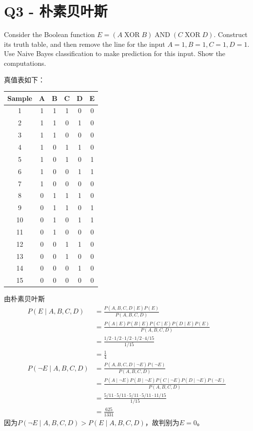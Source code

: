 \documentclass[a4paper, 11pt]{article}
\begin{document}
\newpage
\section{Q3 - 朴素贝叶斯}
\begin{question}\normalfont
Consider the Boolean function $E = (A\;\mathrm{XOR}\;B) \;\mathrm{AND}\; (C\;\mathrm{XOR}\;D)$. Construct its truth table, and then remove the line for the input $A = 1, B = 1, C = 1, D = 1$. Use Naive Bayes classification to make prediction for this input. Show the computations.
\end{question}
\begin{answer}
真值表如下：
\begin{center}
\begin{longtable}{|c|c|c|c|c|c|}\hline
Sample & A & B & C & D & E\\\hline
1 & 1 & 1 & 1 & 0 & 0\\\hline
2 & 1 & 1 & 0 & 1 & 0\\\hline
3 & 1 & 1 & 0 & 0 & 0\\\hline
4 & 1 & 0 & 1 & 1 & 0\\\hline
5 & 1 & 0 & 1 & 0 & 1\\\hline
6 & 1 & 0 & 0 & 1 & 1\\\hline
7 & 1 & 0 & 0 & 0 & 0\\\hline
8 & 0 & 1 & 1 & 1 & 0\\\hline
9 & 0 & 1 & 1 & 0 & 1\\\hline
10 & 0 & 1 & 0 & 1 & 1\\\hline
11 & 0 & 1 & 0 & 0 & 0\\\hline
12 & 0 & 0 & 1 & 1 & 0\\\hline
13 & 0 & 0 & 1 & 0 & 0\\\hline
14 & 0 & 0 & 0 & 1 & 0\\\hline
15 & 0 & 0 & 0 & 0 & 0\\\hline
\end{longtable}
\end{center}
由朴素贝叶斯
\[\begin{aligned}
P(E\mid A,B,C,D)
&=\frac{P(A,B,C,D\mid E)P(E)}{P(A,B,C,D)}\\
&=\frac{P(A\mid E) P(B\mid E) P(C\mid E) P(D\mid E) P(E)}{P(A,B,C,D)}\\
&=\frac{1/2\cdot 1/2\cdot 1/2\cdot 1/2\cdot 4/15}{1/15}\\
&=\frac{1}{4}\\
P(\lnot E\mid A,B,C,D)
&=\frac{P(A,B,C,D\mid \lnot E)P(\lnot E)}{P(A,B,C,D)}\\
&=\frac{P(A\mid \lnot E) P(B\mid \lnot E) P(C\mid \lnot E) P(D\mid \lnot E) P(\lnot E)}{P(A,B,C,D)}\\
&=\frac{5/11\cdot 5/11\cdot 5/11\cdot 5/11\cdot 11/15}{1/15}\\
&=\frac{625}{1331}
\end{aligned}\]
因为$P(\lnot E\mid A,B,C,D)>P(E\mid A,B,C,D)$，故判别为$E=0$。
\end{answer}
\end{document}

